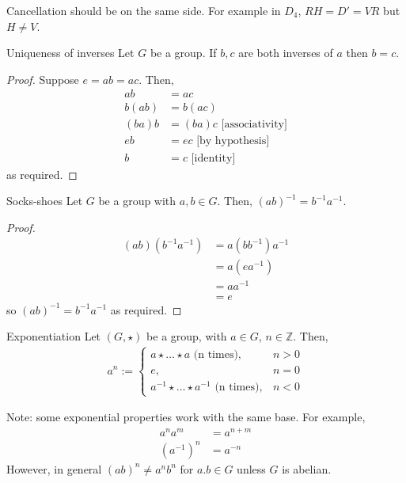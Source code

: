 \documentclass[12pt]{article}
\newcommand{\Z}{\mathbb{Z}}
\newcommand{\inv}{^{-1}}
\begin{document}
	\begin{myrem}{}{}
		Cancellation should be on the same side. For example in $D_4$, $RH=D'=VR$ but $H\neq V$.	
	\end{myrem}
	
	\begin{myprop}{Uniqueness of inverses}{}
		Let $G$ be a group. If $b, c$ are both inverses of $a$ then $b=c$.
		\begin{proof}
			Suppose $e=ab=ac$. Then,\begin{align*}
				ab&=ac\\
				b(ab)&=b(ac)\\
				(ba)b&=(ba)c\text{ [associativity]}\\
				eb&=ec\text{ [by hypothesis]}\\
				b&=c\text{ [identity]}
			\end{align*}
			as required.
		\end{proof}	
	\end{myprop}
	
	\begin{myprop}{Socks-shoes}{}
		Let $G$ be a group with $a, b\in G$. Then, $(ab)\inv=b\inv a\inv$.
		\begin{proof}
			\begin{align*}
				(ab)(b\inv a\inv)&=a(bb\inv)a\inv\\
				&=a(ea\inv)\\
				&=aa\inv\\
				&=e
			\end{align*}
			so $(ab)\inv=b\inv a\inv$ as required.
		\end{proof}			
	\end{myprop}
	
	\begin{mydef}{Exponentiation}{}
		Let $(G, \star)$ be a group, with $a\in G$, $n\in\Z$. Then,
		\begin{align*}
			a^n:=\begin{cases}
				a\star\dots\star a\text{ (n times)},&n>0\\
				e,&n=0\\
				a\inv\star\dots\star a\inv\text{ (n times)},&n<0
			\end{cases}
		\end{align*}
		
		Note: some exponential properties work with the same base. For example,
		\begin{align*}
			a^na^m&=a^{n+m}\\
			(a\inv)^n&=a^{-n}
		\end{align*}
		However, in general $(ab)^n\neq a^nb^n$ for $a. b\in G$ unless $G$ is abelian.
	\end{mydef}
	
\end{document}

